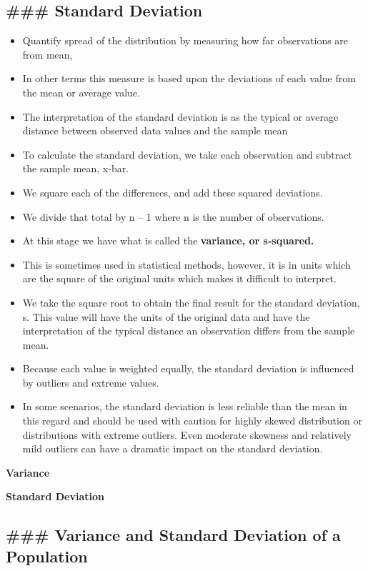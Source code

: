 \documentclass[11pt]{article}
\providecommand{\tightlist}{%
      \setlength{\itemsep}{0pt}\setlength{\parskip}{0pt}}
\begin{document}
    \subsection{\#\#\# Standard Deviation}\label{standard-deviation}

    \begin{itemize}
\tightlist
\item
  Quantify spread of the distribution by measuring how far observations
  are from mean,
\item
  In other terms this measure is based upon the deviations of each value
  from the mean or average value.
\item
  The interpretation of the standard deviation is as the typical or
  average distance between observed data values and the sample mean
\item
  To calculate the standard deviation, we take each observation and
  subtract the sample mean, x‐bar.
\item
  We square each of the differences, and add these squared deviations.
\item
  We divide that total by n -- 1 where n is the number of observations.
\item
  At this stage we have what is called the \textbf{variance, or
  s‐squared.}
\item
  This is sometimes used in statistical methods, however, it is in units
  which are the square of the original units which makes it difficult to
  interpret.
\item
  We take the square root to obtain the final result for the standard
  deviation, s. This value will have the units of the original data and
  have the interpretation of the typical distance an observation differs
  from the sample mean.
\item
  Because each value is weighted equally, the standard deviation is
  influenced by outliers and extreme values.
\item
  In some scenarios, the standard deviation is less reliable than the
  mean in this regard and should be used with caution for highly skewed
  distribution or distributions with extreme outliers. Even moderate
  skewness and relatively mild outliers can have a dramatic impact on
  the standard deviation.
\end{itemize}

\textbf{Variance}

    \textbf{Standard Deviation}

    \subsection{\#\#\# Variance and Standard Deviation of a
Population}\label{variance-and-standard-deviation-of-a-population}
\end{document}
